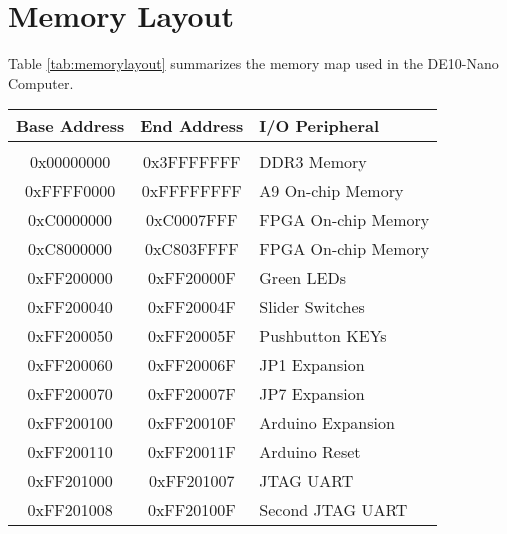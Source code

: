 

\section{Memory Layout}
\label{sec:mm}

\noindent
Table \ref{tab:memorylayout} summarizes the memory map used in the DE10-Nano Computer.
~\\

\begin{table}[h]
    \begin{center}
    \begin{tabular}{c|c|l}
            \textbf{Base Address}
            & \textbf{End Address}
            & \textbf{I/O Peripheral}
				\\\hline\vspace{-3mm}\\
            0x00000000
            & 0x3FFFFFFF
            & DDR3 Memory
        \\
            0xFFFF0000
            & 0xFFFFFFFF
            & A9 On-chip Memory
        \\
						0xC0000000
				  	& 0xC0007FFF
						& FPGA On-chip Memory
				\\
            0xC8000000
            & 0xC803FFFF
            & FPGA On-chip Memory
        \\
            0xFF200000
            & 0xFF20000F
            & Green LEDs
        \\
            0xFF200040
            & 0xFF20004F
            & Slider Switches
        \\
            0xFF200050
            & 0xFF20005F
            & Pushbutton KEYs
        \\
            0xFF200060
            & 0xFF20006F
            & JP1 Expansion
        \\
            0xFF200070
            & 0xFF20007F
            & JP7 Expansion
        \\
            0xFF200100
            & 0xFF20010F
            & Arduino Expansion
        \\
            0xFF200110
            & 0xFF20011F
            & Arduino Reset
        \\
            0xFF201000
            & 0xFF201007
            & JTAG UART
        \\
            0xFF201008
            & 0xFF20100F
            & Second JTAG UART
        \\

\end{tabular}
\end{center}
\end{table}
